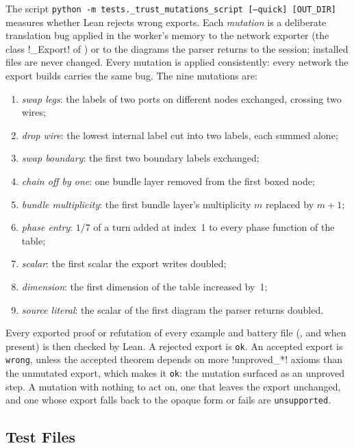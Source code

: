 The script \texttt{python -m tests.\_trust\_mutations\_script [--quick] [OUT\_DIR]} measures whether Lean rejects wrong exports. Each \emph{mutation} is a deliberate translation bug applied in the worker's memory to the network exporter (the class \py!_Export! of ) or to the diagrams the parser returns to the session; installed files are never changed. Every mutation is applied consistently: every network the export builds carries the same bug. The nine mutations are:
\begin{enumerate}
\item \emph{swap legs}: the labels of two ports on different nodes exchanged, crossing two wires;
\item \emph{drop wire}: the lowest internal label cut into two labels, each summed alone;
\item \emph{swap boundary}: the first two boundary labels exchanged;
\item \emph{chain off by one}: one bundle layer removed from the first boxed node;
\item \emph{bundle multiplicity}: the first bundle layer's multiplicity $m$ replaced by $m+1$;
\item \emph{phase entry}: $1/7$ of a turn added at index~1 to every phase function of the table;
\item \emph{scalar}: the first scalar the export writes doubled;
\item \emph{dimension}: the first dimension of the table increased by~1;
\item \emph{source literal}: the scalar of the first diagram the parser returns doubled.
\end{enumerate}
Every exported proof or refutation of every example and battery file (, and  when present) is then checked by Lean. A rejected export is \texttt{ok}. An accepted export is \texttt{wrong}, unless the accepted theorem depends on more \lean!unproved_*! axioms than the unmutated export, which makes it \texttt{ok}: the mutation surfaced as an unproved step. A mutation with nothing to act on, one that leaves the export unchanged, and one whose export falls back to the opaque form or fails are \texttt{unsupported}.

\subsection{Test Files}\label{sec:dev-test-files}

